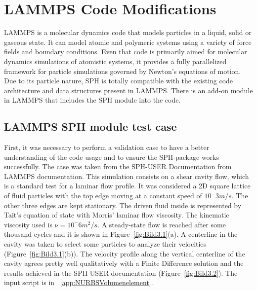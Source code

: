 
\chapter{LAMMPS Code Modifications}
\label{chap:chapter_3}

LAMMPS is a molecular dynamics code that models particles in a liquid, solid or gaseous state\cite{lammps_manual}. It can model atomic and polymeric systems using a variety of force fields and
boundary conditions. Even that code is primarily aimed for molecular dynamics simulations of atomistic systems, it provides a fully parallelized framework for particle simulations
governed by Newton's equations of motion. Due to its particle nature, SPH is totally compatible with the existing code architecture and data structures present in LAMMPS. There is 
an add-on module in LAMMPS that includes the SPH module into the code.\par

\section{LAMMPS SPH module test case}
\label{sec:section_1}

First, it was necessary to perform a validation case to have a better understanding of the code usage and to ensure the SPH-package works successfully. The case was taken from 
the SPH-USER Documentation from LAMMPS documentation\cite{ganzenmuller_implementation_2011}. This simulation consists on a shear cavity flow, which is a standard test for a laminar
flow profile. It was considered a 2D square lattice of fluid particles with the top edge moving at a constant speed of $10^-3m/s$. The other three edges are kept
stationary. The driven fluid inside is represented by Tait's equation of state \cite{neece_tait_1968} with Morris' laminar flow viscosity. The kinematic viscosity used is
$\nu=10^-6m^2/s$. A steady-state flow is reached after some thousand cycles and it is shown in Figure~\ref{fig:Bild3.1}(a). A centerline in the cavity was taken to select some particles
to analyze their velocities (Figure~\ref{fig:Bild3.1}(b)). The velocity profile along the vertical centerline of the cavity 
agrees pretty well qualitatively with a Finite Difference solution and the results achieved in the SPH-USER documentation (Figure~\ref{fig:Bild3.2}). The input script is in ~\ref{app:NURBSVolumenelement}.


